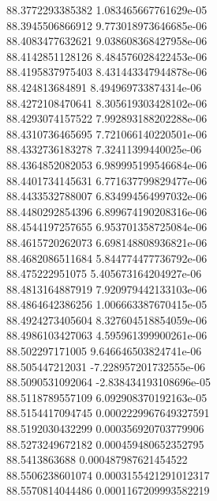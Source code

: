 {88.3772293385382 1.083465667761629e-05
 \\
88.3945506866912 9.773018973646685e-06
 \\
88.4083477632621 9.038608368427958e-06
 \\
88.4142851128126 8.484576028422453e-06
 \\
88.4195837975403 8.431443347944878e-06
 \\
88.424813684891 8.494969733874314e-06
 \\
88.4272108470641 8.305619303428102e-06
 \\
88.4293074157522 7.992893188202288e-06
 \\
88.4310736465695 7.721066140220501e-06
 \\
88.4332736183278 7.32411399440025e-06
 \\
88.4364852082053 6.989995199546684e-06
 \\
88.4401734145631 6.771637799829477e-06
 \\
88.4433532788007 6.834994564997032e-06
 \\
88.4480292854396 6.899674190208316e-06
 \\
88.4544197257655 6.953701358725084e-06
 \\
88.4615720262073 6.698148808936821e-06
 \\
88.4682086511684 5.844774477736792e-06
 \\
88.475222951075 5.405673164204927e-06
 \\
88.4813164887919 7.920979442133103e-06
 \\
88.4864642386256 1.006663387670415e-05
 \\
88.4924273405604 8.327604518854059e-06
 \\
88.4986103427063 4.595961399900261e-06
 \\
88.502297171005 9.646646503824741e-06
 \\
88.505447212031 -7.228957201732555e-06
 \\
88.5090531092064 -2.838434193108696e-05
 \\
88.5118789557109 6.092908370192163e-05
 \\
88.5154417094745 0.0002229967649327591
 \\
88.5192030432299 0.000356920703779906
 \\
88.5273249672182 0.000459480652352795
 \\
88.5413863688 0.000487987621454522
 \\
88.5506238601074 0.0003155421291012317
 \\
88.5570814044486 0.0001167209993582219
}
